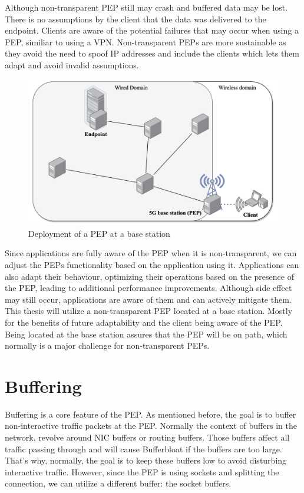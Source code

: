 \documentclass[a4paper,english, 11pt]{report}
\begin{document}
Although non-transparent PEP still may crash and buffered data may be lost. There is no assumptions by the client that the data was delivered to the endpoint. Clients are aware of the potential failures that may occur when using a PEP, similiar to using a VPN. Non-transparent PEPs are more sustainable as they avoid the need to spoof IP addresses and include the clients which lets them adapt and avoid invalid assumptions.\\


\begin{figure} %
	\centering
	\includegraphics[scale=0.55]{../diagrams/drawio/deployment.png}
  	\caption{Deployment of a PEP at a base station}
  	\label{fig:pep_deployment}
\end{figure}


Since applications are fully aware of the PEP when it is non-transparent, we can adjust the PEPs functionality based on the application using it. Applications can also adapt their behaviour, optimizing their operations based on the presence of the PEP, leading to additional performance improvements. Although side effect may still occur, applications are aware of them and can actively mitigate them.\\

This thesis will utilize a non-transparent PEP located at a base station. Mostly for the benefits of future adaptability and the client being aware of the PEP. Being located at the base station assures that the PEP will be on path, which normally is a major challenge for non-transparent PEPs.

\section{Buffering}
Buffering is a core feature of the PEP. As mentioned before, the goal is to buffer non-interactive traffic packets at the PEP. Normally the context of buffers in the network, revolve around NIC buffers or routing buffers. Those buffers affect all traffic passing through and will cause Bufferbloat if the buffers are too large. That's why, normally, the goal is to keep these buffers low to avoid disturbing interactive traffic. However, since the PEP is using sockets and splitting the connection, we can utilize a different buffer: the socket buffers.
\end{document}

